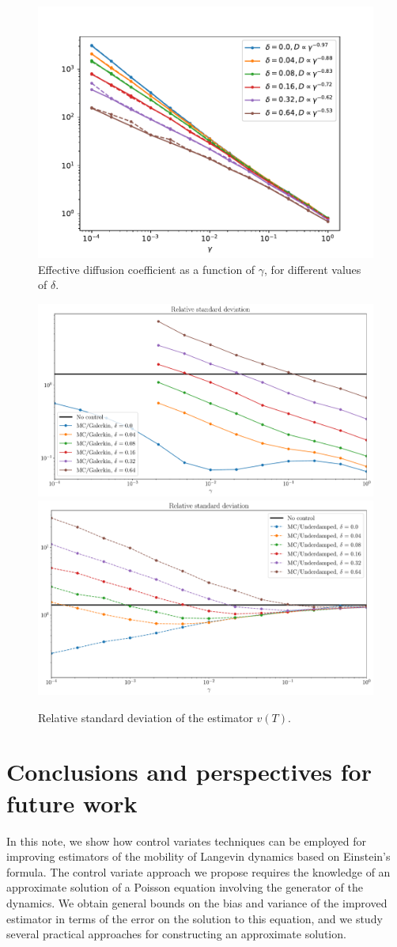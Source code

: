 \documentclass[11pt,a4paper]{article}
\theoremstyle{plain}
\numberwithin{equation}{section}
\begin{document}
\begin{figure}[ht]
    \centering
    \includegraphics[width=0.99\linewidth]{figures/diffusion.pdf}
    \caption{
        Effective diffusion coefficient as a function of $\gamma$,
        for different values of $\delta$.
    }%
    \label{fig:time_bias_variance_2d}
\end{figure}
\begin{figure}[ht]
    \centering
    \includegraphics[width=0.49\linewidth]{figures/var-delta-galerkin.pdf}
    \includegraphics[width=0.49\linewidth]{figures/var-delta-underdamped.pdf}
    \caption{Relative standard deviation of the estimator $v(T)$.}%
\end{figure}

\section{Conclusions and perspectives for future work}%
\label{sec:conclusions_and_perspectives_for_future_work}
In this note,
we show how control variates techniques can be employed for improving estimators of the mobility of Langevin dynamics based on Einstein's formula.
The control variate approach we propose requires the knowledge of an approximate solution of a Poisson equation involving the generator of the dynamics.
We obtain general bounds on the bias and variance of the improved estimator in terms of the error on the solution to this equation,
and we study several practical approaches for constructing an approximate solution.
\end{document}
